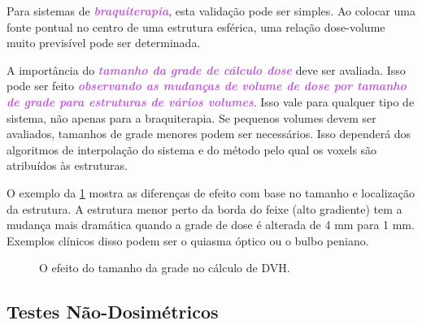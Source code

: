 \documentclass[11pt,a4paper]{article}
\newcounter{exemplo}
\begin{document}
	Para sistemas de \textcolor{MediumOrchid}{\textbf{\textit{braquiterapia}}}, esta validação pode ser simples. Ao colocar uma fonte pontual no centro de uma estrutura esférica, uma relação dose-volume muito previsível pode ser determinada. 
	
	A importância do \textcolor{MediumOrchid}{\textbf{\textit{tamanho da grade de cálculo dose}}} deve ser avaliada. Isso pode ser feito \textcolor{MediumOrchid}{\textbf{\textit{observando as mudanças de volume de dose por tamanho de grade para estruturas de vários volumes}}}. Isso vale para qualquer tipo de sistema, não apenas para a braquiterapia. Se pequenos volumes devem ser avaliados, tamanhos de grade menores podem ser necessários. Isso dependerá dos algoritmos de interpolação do sistema e do método pelo qual os voxels são atribuídos às estruturas.

	O exemplo da \ref{fig:efeitoDaGradeDeCalculoNoDVH} mostra as diferenças de efeito com base no tamanho e localização da estrutura. A estrutura menor perto da borda do feixe (alto gradiente) tem a mudança mais dramática quando a grade de dose é alterada de 4 mm para 1 mm. Exemplos clínicos disso podem ser o quiasma óptico ou o bulbo peniano.

	\begin{figure}[h]
		\centering
		\caption{O efeito do tamanho da grade no cálculo de DVH.}
		\label{fig:efeitoDaGradeDeCalculoNoDVH}
	\end{figure}

\subsection*{Testes Não-Dosimétricos}
\end{document}
